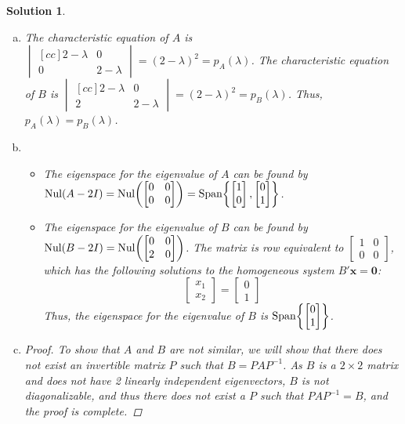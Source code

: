 \documentclass[11pt]{scrartcl}
\theoremstyle{dotlessP}
\newtheorem{sol}{Solution}[section]
\theoremstyle{dotlessN}
\DeclarePairedDelimiter\paren{(}{)} %
\DeclarePairedDelimiter\set{\{}{\}}
\newcommand{\nul}{\text{Nul}}
\newcommand{\spa}[1]{\text{Span}\set*{#1}}
\begin{document}
\begin{sol} \
	\begin{enumerate}[a)]
		\item The characteristic equation of $A$ is 
		$
		\begin{vmatrix}[cc]
			2 - \lambda & 0 \\
			0 & 2 - \lambda
		\end{vmatrix} = (2-\lambda)^2 = p_A(\lambda)
		$. The characteristic equation of $B$ is
		$
		\begin{vmatrix}[cc]
			2 - \lambda & 0 \\
			2 & 2 - \lambda
		\end{vmatrix} = (2-\lambda)^2 = p_B(\lambda)
		$. Thus, $p_A(\lambda) = p_B(\lambda)$.
	\item 
		\begin{itemize}
			\item The eigenspace for the eigenvalue of $A$ can be found by $\nul(A - 2I) = 
				\nul\paren*{
\begin{bmatrix}
	0 & 0 \\
	0 & 0 
\end{bmatrix}
} = \spa{
\begin{bmatrix}
	1 \\
	0
\end{bmatrix},
\begin{bmatrix}
	0 \\
	1
\end{bmatrix}
}
				$. 
			\item The eigenspace for the eigenvalue of $B$ can be found by $\nul(B - 2I) = 
				\nul\paren*{
\begin{bmatrix}
	0 & 0 \\
	2 & 0 
\end{bmatrix}
				}
				$. The matrix is row equivalent to 
				$
\begin{bmatrix}
	1 & 0 \\
	0 & 0
\end{bmatrix}
$, which has the following solutions to the homogeneous system $B'\bm{x} = \bm{0}$:
 \[
\begin{bmatrix}
x_1 \\
x_2
\end{bmatrix} = 
\begin{bmatrix}
	0 \\
	1
\end{bmatrix}
\]
Thus, the eigenspace for the eigenvalue of $B$ is $\spa{
\begin{bmatrix}
	0 \\
	1
\end{bmatrix}
}$.
		\end{itemize}
	\item 
		\begin{proof}
			To show that $A$ and $B$ are not similar, we will show that there does not exist an invertible matrix $P$ such that $B = PAP^{-1}$. As $B$ is a $2 \times 2$ matrix and does not have 2 linearly independent eigenvectors, $B$ is not diagonalizable, and thus there does not exist a $P$ such that $PAP^{-1} = B$, and the proof is complete.
		\end{proof}
	\end{enumerate}
\end{sol}
\end{document}
